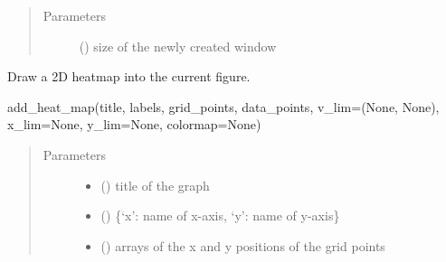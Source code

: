 \documentclass[letterpaper,10pt,english,openany,oneside]{sphinxmanual}
\begin{document}
\begin{fulllineitems}
\begin{fulllineitems}
\end{fulllineitems}

\begin{quote}\begin{description}
\item[{Parameters}] \leavevmode
{} (\sphinxstyleliteralemphasis{\sphinxupquote{, }}\sphinxstyleliteralemphasis{\sphinxupquote{, }}\sphinxstyleliteralemphasis{\sphinxupquote{(}}\sphinxstyleliteralemphasis{\sphinxupquote{,}}\sphinxstyleliteralemphasis{\sphinxupquote{)}}) \textendash{} size of the newly created window

\end{description}\end{quote}

\begin{fulllineitems}
\label{\detokenize{pygpc:pygpc.vis.Visualization.add_heat_map}}
Draw a 2D heatmap into the current figure.

add\_heat\_map(title, labels, grid\_points, data\_points, v\_lim=(None, None), x\_lim=None, y\_lim=None, colormap=None)
\begin{quote}\begin{description}
\item[{Parameters}] \leavevmode\begin{itemize}
\item {} 
 () \textendash{} title of the graph

\item {} 
 () \textendash{} \{‘x’: name of x-axis, ‘y’: name of y-axis\}

\item {} 
 (\sphinxstyleliteralemphasis{\sphinxupquote{{[}}}\sphinxstyleliteralemphasis{\sphinxupquote{{]} }}) \textendash{} arrays of the x and y positions of the grid points


\end{itemize}
\end{description}
\end{quote}
\end{fulllineitems}
\end{fulllineitems}
\end{document}
